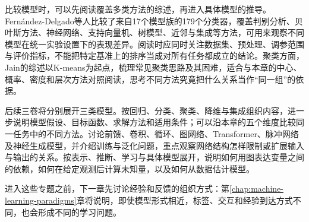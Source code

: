 比较模型时，可以先阅读覆盖多类方法的综述，再进入具体模型的推导。Fernández-Delgado等人比较了来自17个模型族的179个分类器，覆盖判别分析、贝叶斯方法、神经网络、支持向量机、树模型、近邻与集成等方法，可用来观察不同模型在统一实验设置下的表现差异。阅读时应同时关注数据集、预处理、调参范围与评价指标，不能把特定基准上的排序当成对所有任务都成立的结论。聚类方面，Jain的综述以K-means为起点，梳理常见聚类思路及其困难，适合与本章的中心、概率、密度和层次方法对照阅读，思考不同方法究竟把什么关系当作“同一组”的依据。

后续三卷将分别展开三类模型。按回归、分类、聚类、降维与集成组织内容，进一步说明模型假设、目标函数、求解方法和适用条件；可以沿本章的五个维度比较同一任务中的不同方法。讨论前馈、卷积、循环、图网络、Transformer、脉冲网络及神经生成模型，并介绍训练与泛化问题，重点观察网络结构怎样限制或扩展输入与输出的关系。按表示、推断、学习与具体模型展开，说明如何用图表达变量之间的依赖，如何在给定观测后计算未知量，以及如何从数据估计模型。

进入这些专题之前，下一章先讨论经验和反馈的组织方式：第\ref{chap:machine-learning-paradigms}章将说明，即使模型形式相近，标签、交互和经验到达方式不同，也会形成不同的学习问题。

